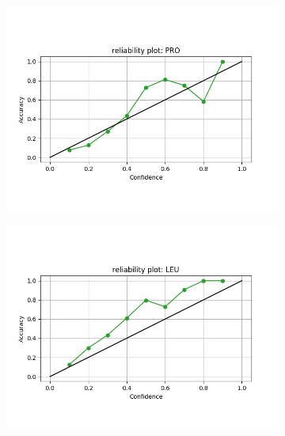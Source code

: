 \begin{figure}[!ht]
\begin{minipage}[b]{0.45\linewidth}
\begin{subfigure}[b]{\linewidth}
	\includegraphics[width=1.27\textwidth]{pics/rel_PRO_31_RR}
\end{subfigure}
\begin{subfigure}[b]{\linewidth}
	\includegraphics[width=1.27\textwidth]{pics/rel_LEU_31_RR}
\end{subfigure}


\end{minipage}
\end{figure}
